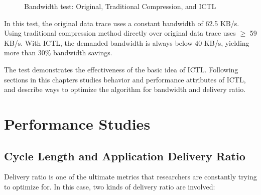 \documentclass[12pt]{report}
\begin{document}
\begin{figure}[h]
  \caption{\label{fig:first_glance}Bandwidth test: Original, Traditional Compression, and ICTL }
\end{figure}

In this test, the original data trace uses a constant bandwidth of 62.5 KB/s. Using traditional compression method directly over original data trace uses $\ge$ 59 KB/s. With ICTL, the demanded bandwidth is always below 40 KB/s, yielding more than 30\% bandwidth savings.

The test demonstrates the effectiveness of the basic idea of ICTL. Following sections in this chapters studies behavior and performance attributes of ICTL, and describe ways to optimize the algorithm for bandwidth and delivery ratio.


\section{Performance Studies}

\subsection{Cycle Length and Application Delivery Ratio}
\label{sec:cl_adr}

Delivery ratio is one of the ultimate metrics that researchers are constantly trying to optimize for. In this case, two kinds of delivery ratio are involved:
\end{document}
